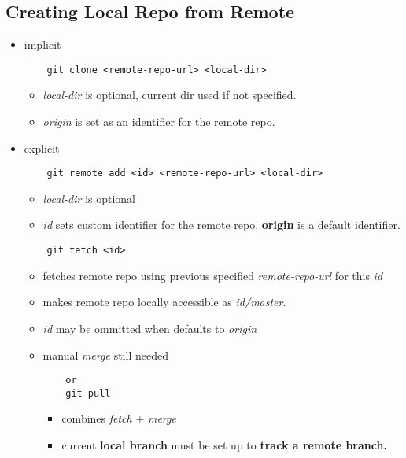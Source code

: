 \documentclass{report}
\begin{document}
\subsection{Creating Local Repo from Remote}
\begin{itemize}
	\item implicit
	\begin{verbatim}
	git clone <remote-repo-url> <local-dir>
	\end{verbatim}
	\begin{itemize}
		\item \textit{local-dir} is optional, current dir used if not specified.
		\item \textit{origin} is set as an identifier for the remote repo.
	\end{itemize}
	
	\item explicit
	\begin{verbatim}
	git remote add <id> <remote-repo-url> <local-dir>
	\end{verbatim}
	\begin{itemize}
		\item \textit{local-dir} is optional
		\item \textit{id} sets custom identifier for the remote repo. \textbf{origin} is a default identifier.
	\end{itemize}
	\begin{verbatim}
	git fetch <id>
	\end{verbatim}
	\begin{itemize}
		\item fetches remote repo using previous specified \textit{remote-repo-url} for this \textit{id}
		\item makes remote repo locally accessible as \textit{id/master}.
		\item \textit{id} may be ommitted when defaults to \textit{origin}
		\item manual \textit{merge} still needed
		
	\begin{verbatim}
	or
	git pull
	\end{verbatim}	
	\begin{itemize}
		\item combines \textit{fetch} + \textit{merge}
		\item current \textbf{local branch} must be set up to \textbf{track a remote branch.}
	\end{itemize}
	
	\end{itemize}
\end{itemize}
\end{document}
